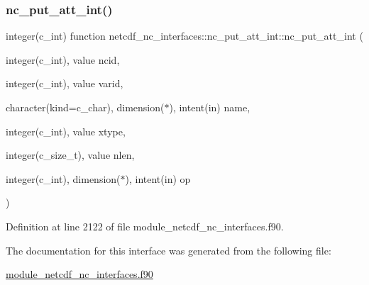 \subsubsection{\texorpdfstring{nc\+\_\+put\+\_\+att\+\_\+int()}{nc\_put\_att\_int()}}
{\footnotesize\ttfamily integer(c\+\_\+int) function netcdf\+\_\+nc\+\_\+interfaces\+::nc\+\_\+put\+\_\+att\+\_\+int\+::nc\+\_\+put\+\_\+att\+\_\+int (\begin{DoxyParamCaption}\item[{integer(c\+\_\+int), value}]{ncid,  }\item[{integer(c\+\_\+int), value}]{varid,  }\item[{character(kind=c\+\_\+char), dimension($\ast$), intent(in)}]{name,  }\item[{integer(c\+\_\+int), value}]{xtype,  }\item[{integer(c\+\_\+size\+\_\+t), value}]{nlen,  }\item[{integer(c\+\_\+int), dimension($\ast$), intent(in)}]{op }\end{DoxyParamCaption})}



Definition at line 2122 of file module\+\_\+netcdf\+\_\+nc\+\_\+interfaces.\+f90.



The documentation for this interface was generated from the following file\+:\begin{DoxyCompactItemize}
\item 
\hyperlink{module__netcdf__nc__interfaces_8f90}{module\+\_\+netcdf\+\_\+nc\+\_\+interfaces.\+f90}\end{DoxyCompactItemize}
